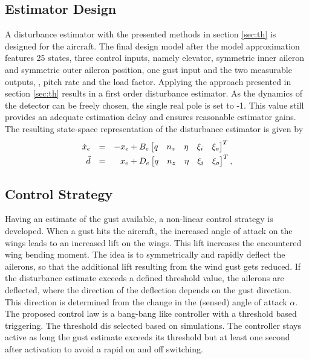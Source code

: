 \documentclass[graybox]{svmult}
\begin{document}
\subsection{Estimator Design}
A disturbance estimator with the presented methods in section \ref{sec:th} is designed for the aircraft. The final design model after the model approximation features 25 states, three control inputs, namely elevator, symmetric inner aileron and symmetric outer aileron position, one gust input and the two measurable outputs, \ie,  pitch rate and the load factor. Applying the approach presented in section \ref{sec:th} results in a first order disturbance estimator. As the dynamics of the detector can be freely chosen, the single real pole is set to -1.
This value still provides an adequate estimation delay and ensures reasonable estimator gains.
The resulting state-space representation of the disturbance estimator is given by
\begin{equation}\label{eq:obs}
	\begin{array}{rcr}
		\dot x_e  &=& -x_e + B_e
		\begin{bmatrix}
			q & n_z & \eta & \xi_i & \xi _o 
		\end{bmatrix}^T \,\,\, \vspace{+1mm} \\ 
		\tilde d &=&  x_e + 
		D_e
		\begin{bmatrix}
			q & n_z & \eta & \xi_i & \xi _o 
		\end{bmatrix}^T,
	\end{array}
\end{equation}



\subsection{Control Strategy}
Having an estimate of the gust available, a non-linear control strategy is developed. When a gust hits the aircraft, the increased angle of attack on the wings leads to an increased  lift  on the wings. This lift increases the encountered wing bending moment. The idea is to symmetrically and rapidly deflect the ailerons, so that the additional lift resulting from the wind gust gets reduced. If the disturbance estimate exceeds a defined threshold value, the ailerons are deflected, where the direction of the deflection depends on the gust direction. This direction is determined from the change in the (sensed) angle of attack $\alpha$. The proposed control law is a bang-bang like controller with a threshold based triggering. The threshold dis selected based on simulations.
The controller stays active as long the gust estimate exceeds its threshold but at least one second after activation to avoid a rapid on and off switching.
\end{document}
